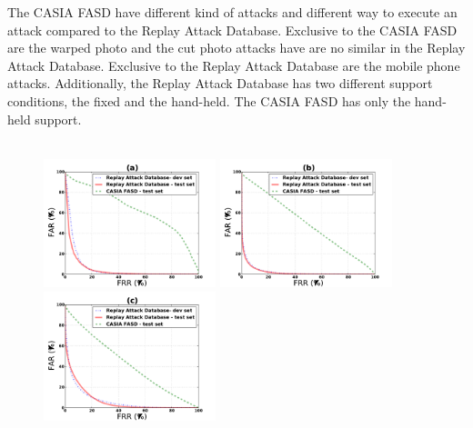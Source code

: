The CASIA FASD have different kind of attacks and different way to execute an attack compared to the Replay Attack Database. Exclusive to the CASIA FASD are the warped photo and the cut photo attacks have are no similar in the Replay Attack Database. Exclusive to the Replay Attack Database are the mobile phone attacks. Additionally, the Replay Attack Database has two different support conditions, the fixed and the hand-held. The CASIA FASD has only the hand-held support. \\ \\


\begin{figure}[ht]
\begin{center}
\includegraphics [width=5cm] {plots/CROSS-DATABASE/MOTION/roc_replay-machine.pdf} 
\includegraphics [width=5cm] {plots/CROSS-DATABASE/LBPTOP/roc_replay-machine.pdf}
\includegraphics [width=5cm] {plots/CROSS-DATABASE/LBP/roc_replay-machine.pdf}


\end{center}
\end{figure}
